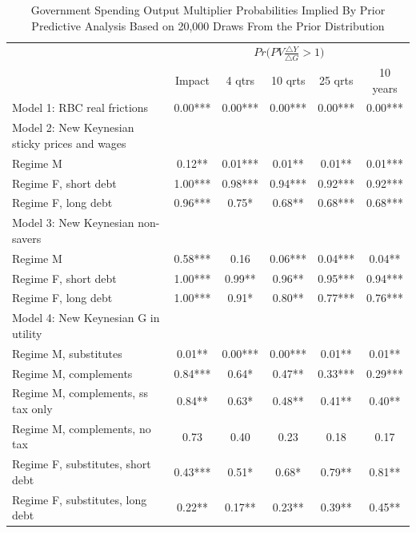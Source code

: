 \documentclass[letterpaper,12pt]{article}%
\begin{document}
\begin{table}[H]
    \centering
    \begin{threeparttable}
    \caption{Government Spending Output Multiplier Probabilities Implied By Prior Predictive Analysis Based on 20,000 Draws From the Prior Distribution}
    \begin{tabular}{l c c c c c}
    \toprule
        & \multicolumn{5}{c}{$Pr\Big(PV \frac{\triangle Y}{\triangle G}>1\Big)$}\\
      \cmidrule{2-6}
        & Impact & 4 qtrs & 10 qrts & 25 qrts & 10 years \\
       \midrule
     Model 1: RBC real frictions & 0.00***   & 0.00***  & 0.00***  & 0.00***  & 0.00*** \\
     Model 2: New Keynesian sticky prices and wages  &    &   &   &   &       \\
     \quad Regime M & 0.12** & 0.01*** & 0.01** & 0.01** & 0.01***  \\
     \quad Regime F, short debt & 1.00*** &  0.98***  & 0.94*** & 0.92***  & 0.92***  \\
     \quad Regime F, long debt &  0.96*** & 0.75* & 0.68** &  0.68***  & 0.68***  \\
     Model 3: New Keynesian non-savers &    &   &   &   &  \\
     \quad Regime M &   0.58*** & 0.16 & 0.06***  & 0.04*** & 0.04** \\
     \quad Regime F, short debt &  1.00*** &  0.99**  & 0.96** & 0.95***  & 0.94*** \\
     \quad Regime F, long debt &   1.00*** & 0.91* & 0.80** & 0.77***  & 0.76*** \\
     Model 4: New Keynesian G in utility &    &   &   &   &  \\
     \quad Regime M, substitutes &   0.01** & 0.00*** & 0.00***  & 0.01**  & 0.01**  \\
     \quad Regime M, complements &   0.84*** &  0.64* &  0.47**  & 0.33***  & 0.29***  \\
     \quad Regime M, complements, ss tax only &   0.84** & 0.63*  & 0.48** & 0.41** & 0.40**  \\
     \quad Regime M, complements, no tax &   0.73 &  0.40 & 0.23  & 0.18 & 0.17 \\
     \quad Regime F, substitutes, short debt &  0.43*** & 0.51*  & 0.68*  & 0.79** & 0.81**  \\
     \quad Regime F, substitutes, long debt &  0.22**  & 0.17**  & 0.23** &  0.39**  & 0.45** \\

\end{tabular}
\end{threeparttable}
\end{table}
\end{document}
